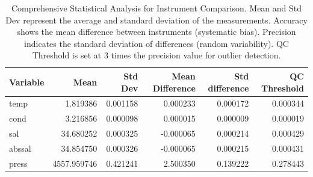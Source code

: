 \begin{table}[h]
\centering
\begin{tabular}{|l|r|r|r|r|r|}
\hline
Variable & Mean & Std Dev & Mean Difference & Std difference & QC Threshold \\ 
\hline
temp & 1.819386 & 0.001158 & 0.000233 & 0.000172 & 0.000344 \\ 
cond & 3.216856 & 0.000098 & 0.000015 & 0.000009 & 0.000019 \\ 
sal & 34.680252 & 0.000325 & -0.000065 & 0.000214 & 0.000429 \\ 
abssal & 34.854750 & 0.000326 & -0.000065 & 0.000215 & 0.000431 \\ 
press & 4557.959746 & 0.421241 & 2.500350 & 0.139222 & 0.278443 \\ 
\hline
\end{tabular}
\caption{Comprehensive Statistical Analysis for Instrument Comparison. Mean and Std Dev represent the average and standard deviation of the measurements. Accuracy shows the mean difference between instruments (systematic bias). Precision indicates the standard deviation of differences (random variability). QC Threshold is set at 3 times the precision value for outlier detection.}
\label{tab:diff_stats}
\end{table}
